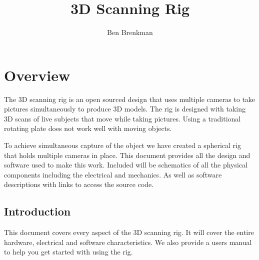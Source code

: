 \documentclass[titlepage]{hitec}
\title{3D Scanning Rig}\let\Title\@title
\author{Ben Brenkman}          \let\Author\@author
\begin{document}




\section*{Overview}
The 3D scanning rig is an open sourced design that uses multiple cameras to take pictures simultaneously to produce 3D models.
The rig is designed with taking 3D scans of live subjects that move while taking pictures. Using a traditional rotating plate does not work well with moving objects.
\par To achieve simultaneous capture of the object we have created a spherical rig that holds multiple cameras in place. This document provides all the design and software used to make this work. Included will be schematics of all the physical components including the electrical and mechanics. As well as software descriptions with links to access the source code.
\subsection*{Introduction}
This document covers every aspect of the 3D scanning rig. It will cover the entire hardware, electrical and software characteristics. We also provide a users manual to help you get started with using the rig.


\newpage
\tableofcontents
\newpage




\end{document}
